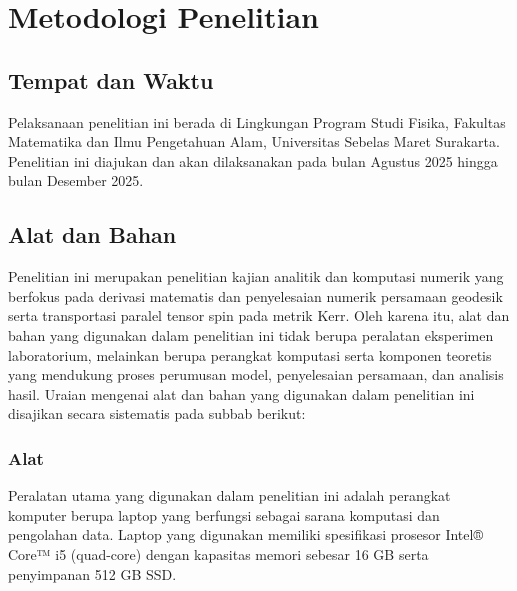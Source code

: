 

\chapter{Metodologi Penelitian}
\label{chap:metode}

\section{Tempat dan Waktu}
\label{sec:tempat-waktu}

Pelaksanaan penelitian ini berada di Lingkungan Program Studi Fisika, Fakultas Matematika dan Ilmu Pengetahuan Alam, Universitas Sebelas Maret Surakarta. Penelitian ini diajukan dan akan dilaksanakan pada bulan Agustus 2025 hingga bulan Desember 2025.

\section{Alat dan Bahan}
\label{sec:alat-bahan}

Penelitian ini merupakan penelitian kajian analitik dan komputasi numerik yang berfokus pada derivasi matematis dan penyelesaian numerik persamaan geodesik serta transportasi paralel tensor spin pada metrik Kerr. Oleh karena itu, alat dan bahan yang digunakan dalam penelitian ini tidak berupa peralatan eksperimen laboratorium, melainkan berupa perangkat komputasi serta komponen teoretis yang mendukung proses perumusan model, penyelesaian persamaan, dan analisis hasil. Uraian mengenai alat dan bahan yang digunakan dalam penelitian ini disajikan secara sistematis pada subbab berikut:

\subsection{Alat}
\label{subsec:alat}

Peralatan utama yang digunakan dalam penelitian ini adalah perangkat komputer berupa laptop yang berfungsi sebagai sarana komputasi dan pengolahan data. Laptop yang digunakan memiliki spesifikasi prosesor Intel® Core™ i5 (quad-core) dengan kapasitas memori sebesar 16 GB serta penyimpanan 512 GB SSD.

